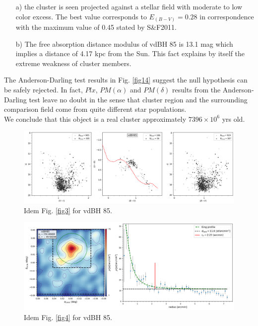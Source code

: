 \documentclass[draft]{aa}
\begin{document}
\begin{itemize}
\item [a)] the cluster is seen projected against a stellar field with moderate
    to low color excess. The best value corresponds to $E_{(B-V)} = 0.28$ in
    correspondence with the maximum value of 0.45 stated by S\&F2011.
\item [b)] The free absorption distance modulus of vdBH 85 is
    13.1 mag which implies a distance of 4.17 kpc from the Sun. This fact
    explains by itself the extreme weakness of cluster members.
\end{itemize}

The Anderson-Darling test results in Fig. \ref{fig14} suggest the null
hypothesis can be safely rejected. In fact, $Plx$, $PM(\alpha)$ and
$PM(\delta)$ results from the Anderson-Darling test leave no doubt in the sense
that cluster region and the surrounding comparison field come from quite
different star populations.\\

We conclude that this object is a real cluster approximately $7396\times10^6$
yrs old.

\begin{figure}[ht]
    \centering
    \includegraphics[width=\hsize]{../figs/obs_vdBH85.png}
    \caption{Idem Fig. \ref{fig3} for vdBH 85.}
    \label{fig11}
\end{figure}

\begin{figure}[ht]
    \centering
    \includegraphics[width=\hsize]{../figs/dmap_vdbh85.png}
    \caption{Idem Fig. \ref{fig4} for vdBH 85.}
    \label{fig12}
\end{figure}
\end{document}
